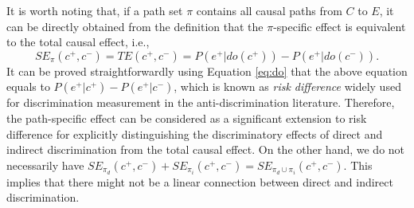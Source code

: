 \documentclass[letterpaper]{article}
\newtheorem{definition}{Definition}
\newtheorem{theorem}{Theorem}
\begin{document}
It is worth noting that, if a path set $\pi$ contains all causal paths from $C$ to $E$, it can be directly obtained from the definition that the $\pi$-specific effect is equivalent to the total causal effect, i.e., 
\begin{equation*}
SE_{\pi}(c^{+},c^{-}) = TE(c^{+},c^{-}) = P(e^{+}|do(c^{+}))-P(e^{+}|do(c^{-})).
\end{equation*}
It can be proved straightforwardly using Equation \eqref{eq:do} that the above equation equals to $P(e^{+}|c^{+})-P(e^{+}|c^{-})$, which is known as \emph{risk difference} \cite{romei2014multidisciplinary} widely used for discrimination measurement in the anti-discrimination literature. Therefore, the path-specific effect can be considered as a significant extension to risk difference for explicitly distinguishing the discriminatory effects of direct and indirect discrimination from the total causal effect. On the other hand, we do not necessarily have $SE_{\pi_{d}}(c^{+},c^{-})+SE_{\pi_{i}}(c^{+},c^{-})=SE_{\pi_{d}\cup \pi_{i}}(c^{+},c^{-})$. This implies that there might not be a linear connection between direct and indirect discrimination.

\end{document}
